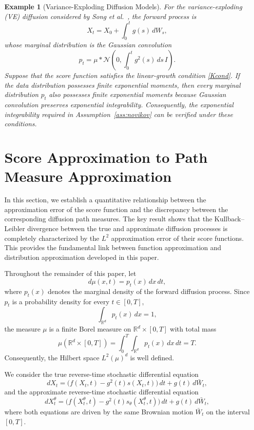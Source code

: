 \documentclass[11pt]{article}
\newtheorem{example}{Example}
\begin{document}
\begin{example}[Variance-Exploding Diffusion Models]
For the variance-exploding (VE) diffusion considered by
Song et al.~\cite{Song2021}, the forward process is
\[
X_t
=
X_0+\int_0^t g(s)\,dW_s,
\]
whose marginal distribution is the Gaussian convolution
\[
p_t
=
\mu*
\mathcal N
\!\left(
0,
\int_0^tg^2(s)\,ds\,I
\right).
\]
Suppose that the score function satisfies the linear-growth condition
\eqref{Kcond}. If the data distribution possesses finite exponential
moments, then every marginal distribution $p_t$ also possesses finite
exponential moments because Gaussian convolution preserves exponential
integrability. Consequently, the exponential integrability required in
Assumption~\ref{ass:novikov} can be verified under these conditions.
\end{example}


\section{Score Approximation to Path Measure Approximation}

In this section, we establish a quantitative relationship between the
approximation error of the score function and the discrepancy between the
corresponding diffusion path measures. The key result shows that the
Kullback--Leibler divergence between the true and approximate diffusion
processes is completely characterized by the $L^2$ approximation error of
their score functions. This provides the fundamental link between function
approximation and distribution approximation developed in this paper.

Throughout the remainder of this paper, let
\[
d\mu(x,t)=p_t(x)\,dx\,dt,
\]
where $p_t(x)$ denotes the marginal density of the forward diffusion process.
Since $p_t$ is a probability density for every $t\in[0,T]$,
\[
\int_{\mathbb R^d}p_t(x)\,dx=1,
\]
the measure $\mu$ is a finite Borel measure on
$\mathbb R^d\times[0,T]$ with total mass
\[
\mu(\mathbb R^d\times[0,T])
=
\int_0^T
\int_{\mathbb R^d}
p_t(x)\,dx\,dt
=
T.
\]
Consequently, the Hilbert space
$L^2(\mu)^d$ is well defined.

We consider the true reverse-time stochastic differential equation
\[
dX_t
=
\bigl(f(X_t,t)-g^2(t)s(X_t,t)\bigr)\,dt
+
g(t)\,d\bar W_t,
\]
and the approximate reverse-time stochastic differential equation
\[
dX_t^\theta
=
\bigl(f(X_t^\theta,t)-g^2(t)s_\theta(X_t^\theta,t)\bigr)\,dt
+
g(t)\,d\bar W_t,
\]
where both equations are driven by the same Brownian motion
$\bar W_t$ on the interval $[0,T]$.
\end{document}

